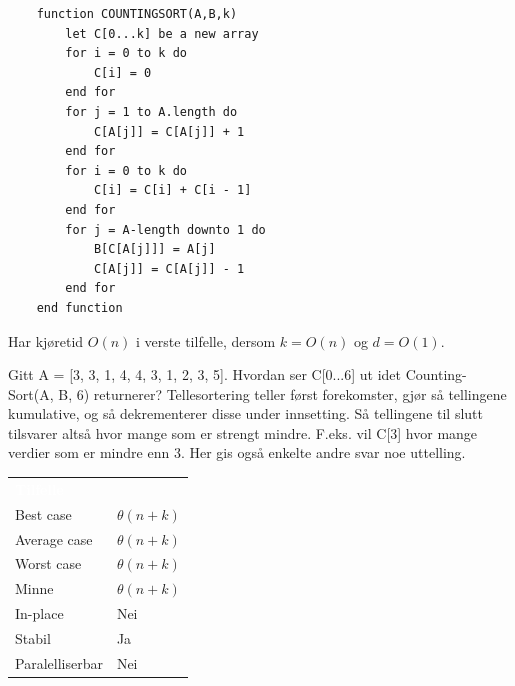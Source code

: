 \begin{lstlisting}
    function COUNTINGSORT(A,B,k)
	    let C[0...k] be a new array
    	for i = 0 to k do
    		C[i] = 0
    	end for
    	for j = 1 to A.length do
    		C[A[j]] = C[A[j]] + 1
    	end for
    	for i = 0 to k do
    		C[i] = C[i] + C[i - 1]
    	end for
    	for j = A-length downto 1 do
    		B[C[A[j]]] = A[j]
    		C[A[j]] = C[A[j]] - 1
    	end for
    end function
\end{lstlisting}

\noindent Har kjøretid $O(n)$ i verste tilfelle, dersom $k = O(n)$ og $d = O(1)$.\\

\begin{boxed}
Gitt A = [3, 3, 1, 4, 4, 3, 1, 2, 3, 5]. Hvordan ser C[0...6] ut idet Counting-Sort(A, B, 6) returnerer?
\newline\newline
[0, 0, 2, 3, 7, 9, 10] \newline\newline  Tellesortering teller først forekomster, gjør så tellingene kumulative, og så dekrementerer disse under innsetting. Så tellingene til slutt tilsvarer altså hvor mange som er strengt mindre. F.eks. vil C[3] hvor mange verdier som er mindre enn 3. Her gis også enkelte andre svar noe uttelling.
\end{boxed}

\begin{table}[H]
    \label{tab:bubblesort}
    \centering
    \begin{tabular}{|L{15em} | L{15em}|}
        \hline
        \textbf{\textcolor{white}{Tilfelle}} & \textbf{\textcolor{white}{}}\\
        Best case & $\theta(n + k)$\\
        Average case & $\theta(n + k)$\\
        Worst case & $\theta(n + k)$\\
        Minne & $\theta(n + k)$\\
        In-place & Nei\\
        Stabil & Ja\\
        Paralelliserbar & Nei\\
         \hline
    \end{tabular}
\end{table}

